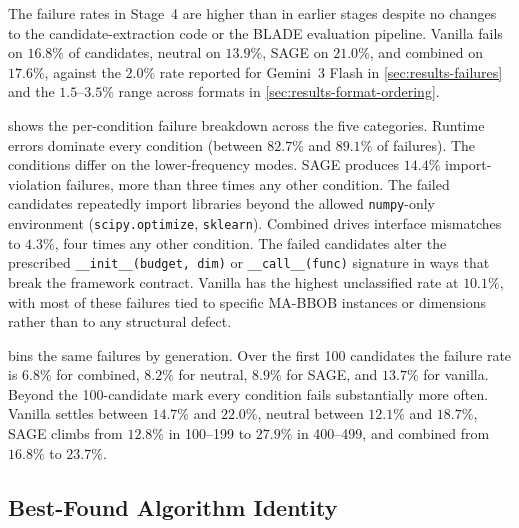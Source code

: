The failure rates in Stage~4 are higher than in earlier stages despite no changes to the candidate-extraction code or the BLADE evaluation pipeline. Vanilla fails on $16.8\%$ of candidates, neutral on $13.9\%$, SAGE on $21.0\%$, and combined on $17.6\%$, against the $2.0\%$ rate reported for Gemini~3 Flash in \cref{sec:results-failures} and the $1.5$--$3.5\%$ range across formats in \cref{sec:results-format-ordering}.

 shows the per-condition failure breakdown across the five categories. Runtime errors dominate every condition (between $82.7\%$ and $89.1\%$ of failures). The conditions differ on the lower-frequency modes. SAGE produces $14.4\%$ import-violation failures, more than three times any other condition. The failed candidates repeatedly import libraries beyond the allowed \texttt{numpy}-only environment (\texttt{scipy.optimize}, \texttt{sklearn}). Combined drives interface mismatches to $4.3\%$, four times any other condition. The failed candidates alter the prescribed \texttt{\_\_init\_\_(budget, dim)} or \texttt{\_\_call\_\_(func)} signature in ways that break the framework contract. Vanilla has the highest unclassified rate at $10.1\%$, with most of these failures tied to specific MA-BBOB instances or dimensions rather than to any structural defect.

 bins the same failures by generation. Over the first 100 candidates the failure rate is $6.8\%$ for combined, $8.2\%$ for neutral, $8.9\%$ for SAGE, and $13.7\%$ for vanilla. Beyond the 100-candidate mark every condition fails substantially more often. Vanilla settles between $14.7\%$ and $22.0\%$, neutral between $12.1\%$ and $18.7\%$, SAGE climbs from $12.8\%$ in 100--199 to $27.9\%$ in 400--499, and combined from $16.8\%$ to $23.7\%$.

\subsection{Best-Found Algorithm Identity}
\label{sec:results-stage4-winners}

